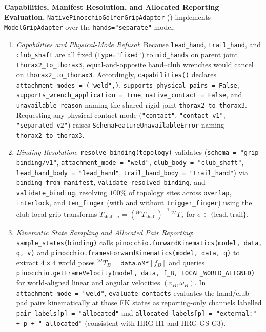 \documentclass[11pt,a4paper]{article}
\begin{document}
\textbf{Capabilities, Manifest Resolution, and Allocated Reporting Evaluation.}
\texttt{NativePinocchioGolferGripAdapter} () implements \texttt{ModelGripAdapter} over the \texttt{hands="separate"} model:
\begin{enumerate}[leftmargin=*,noitemsep]
\item \textit{Capabilities and Physical-Mode Refusal}: Because \texttt{lead\_hand}, \texttt{trail\_hand}, and \texttt{club\_shaft} are all fixed (\texttt{type="fixed"}) to \texttt{mid\_hands} on parent joint \texttt{thorax2\_to\_thorax3}, equal-and-opposite hand--club wrenches would cancel on \texttt{thorax2\_to\_thorax3}. Accordingly, \texttt{capabilities()} declares \texttt{attachment\_modes = ("weld",)}, \texttt{supports\_physical\_pairs = False}, \texttt{supports\_wrench\_application = True}, \texttt{native\_contact = False}, and \texttt{unavailable\_reason} naming the shared rigid joint \texttt{thorax2\_to\_thorax3}. Requesting any physical contact mode (\texttt{"contact"}, \texttt{"contact\_v1"}, \texttt{"separated\_v2"}) raises \texttt{SchemaFeatureUnavailableError} naming \texttt{thorax2\_to\_thorax3}.
\item \textit{Binding Resolution}: \texttt{resolve\_binding(topology)} validates  (\texttt{schema = "grip-binding/v1"}, \texttt{attachment\_mode = "weld"}, \texttt{club\_body = "club\_shaft"}, \texttt{lead\_hand\_body = "lead\_hand"}, \texttt{trail\_hand\_body = "trail\_hand"}) via \texttt{binding\_from\_manifest}, \texttt{validate\_resolved\_binding}, and \texttt{validate\_binding}, resolving $100\%$ of topology sites across \texttt{overlap}, \texttt{interlock}, and \texttt{ten\_finger} (with and without \texttt{trigger\_finger}) using the club-local grip transforms $T_{\mathrm{shaft},\sigma} = ({}^{\mathcal{W}}T_{\mathrm{shaft}})^{-1}\,{}^{\mathcal{W}}T_{\sigma}$ for $\sigma \in \{\mathrm{lead}, \mathrm{trail}\}$.
\item \textit{Kinematic State Sampling and Allocated Pair Reporting}: \texttt{sample\_states(binding)} calls \texttt{pinocchio.forwardKinematics(model, data, q, v)} and \texttt{pinocchio.framesForwardKinematics(model, data, q)} to extract $4\times 4$ world poses ${}^{\mathcal{W}}T_B = \texttt{data.oMf}[f_B]$ and queries \texttt{pinocchio.getFrameVelocity(model, data, f\_B, LOCAL\_WORLD\_ALIGNED)} for world-aligned linear and angular velocities $(v_B, \omega_B)$. In \texttt{attachment\_mode = "weld"}, \texttt{evaluate\_contacts} evaluates the hand/club pad pairs kinematically at those FK states as reporting-only channels labelled \texttt{pair\_labels[p] = "allocated"} and \texttt{allocated\_labels[p] = "external:" + p + "\_allocated"} (consistent with HRG-H1 and HRG-GS-G3).

\end{enumerate}
\end{document}
